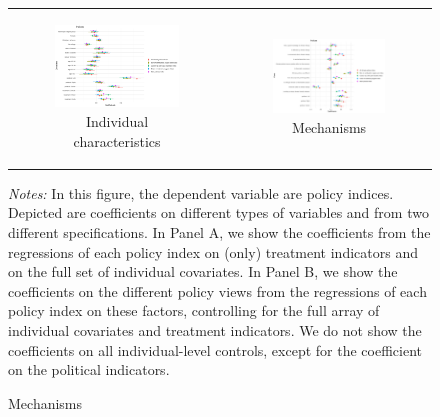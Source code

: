 \documentclass{article}
\begin{document}
\begin{figure}[h!]
\begin{center}
	\caption{Decomposing Tax Policy Views}
	\setlength\extrarowheight{-1pt}
	\begin{tabular}{cc}
		\begin{subfigure}{0.5\textwidth}
		\caption{Individual characteristics}
			\includegraphics[width=\textwidth]{coef_policy_views_all}
		\end{subfigure}&
		\begin{subfigure}{0.5\textwidth}
		\caption{Mechanisms}
			\includegraphics[width=\textwidth]{coef_policy_views_indices_all}
		\end{subfigure}\\
	\end{tabular}
\end{center}

{\footnotesize \textit{Notes:} In this figure, the dependent variable are policy indices. Depicted are coefficients on different types of variables and from two different specifications. In Panel A, we show the coefficients from the regressions of each policy index on (only) treatment indicators and on the full set of individual covariates. In Panel B, we show the coefficients on the different policy views from the regressions of each policy index on these factors, controlling for the full array of individual covariates and treatment indicators. We do not show the coefficients on all individual-level controls, except for the coefficient on the political indicators.}
\end{figure}
\end{document}
